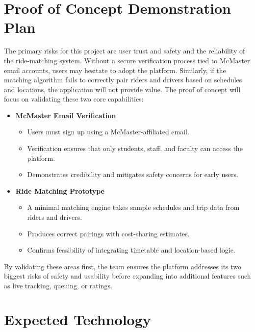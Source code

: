 \documentclass{article}
\begin{document}
\section{Proof of Concept Demonstration Plan}


The primary risks for this project are user trust and safety and the reliability of the ride-matching system.
Without a secure verification process tied to McMaster email accounts, users may hesitate to adopt the platform.
Similarly, if the matching algorithm fails to correctly pair riders and drivers based on schedules and locations, the application will not provide value.
The proof of concept will focus on validating these two core capabilities:

\begin{itemize}
  \item \textbf{McMaster Email Verification}
  \begin{itemize}
      \item Users must sign up using a McMaster-affiliated email.
      \item Verification ensures that only students, staff, and faculty can access the platform.
      \item Demonstrates credibility and mitigates safety concerns for early users.
  \end{itemize}

  \item \textbf{Ride Matching Prototype}
  \begin{itemize}
      \item A minimal matching engine takes sample schedules and trip data from riders and drivers.
      \item Produces correct pairings with cost-sharing estimates.
      \item Confirms feasibility of integrating timetable and location-based logic.
  \end{itemize}
\end{itemize}

By validating these areas first, the team ensures the platform addresses its two biggest risks of safety and usability before expanding into additional features such as live tracking, queuing, or ratings.


\section{Expected Technology}
\end{document}
